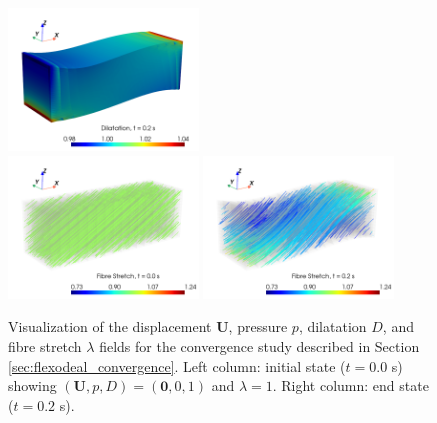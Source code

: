 \documentclass{sfuthesis}
\numberwithin{equation}{section}
\numberwithin{figure}{chapter}
\numberwithin{table}{chapter}
\theoremstyle{definition}
\def\*#1{{\mathbf{#1}}} %
\begin{document}
\begin{figure}
    \includegraphics[width=0.45\textwidth]{convergence-space-dil-020.png}\\
    \includegraphics[width=0.45\textwidth]{convergence-space-lam-000.png}\hspace{2em}
    \includegraphics[width=0.45\textwidth]{convergence-space-lam-020.png}
    \caption{Visualization of the displacement $\*U$, pressure $p$, dilatation $D$, and fibre stretch $\lambda$ fields for the convergence study described in Section \ref{sec:flexodeal_convergence}. Left column: initial state ($t=0.0$ s) showing $(\*U,p,D) = (\*0,0,1)$ and $\lambda = 1$. Right column: end state ($t = 0.2$ s).
    \label{fig:convergence_space_3d_plots}}
\end{figure}
\end{document}
